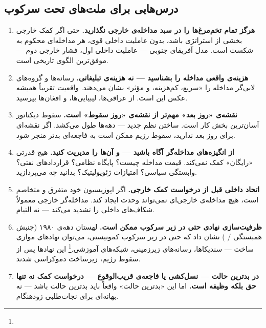 \subsection{درس‌هایی برای ملت‌های تحت سرکوب}
\label{subsec:ch15-lessons-oppressed}

\begin{tcolorbox}[successbox, title={هفت درس عملی برای ملت‌های تحت سرکوب}]
\begin{enumerate}
\item \textbf{هرگز تمام تخم‌مرغ‌ها را در سبد مداخله‌ی خارجی نگذارید.} حتی اگر کمک خارجی بخشی از استراتژی باشد، بدون عاملیت داخلی قوی، هر مداخله‌ای محکوم به شکست است. مدل آفریقای جنوبی — عاملیت داخلی اول، فشار خارجی دوم — موفق‌ترین الگوی تاریخی است.

\item \textbf{هزینه‌ی واقعی مداخله را بشناسید — نه هزینه‌ی تبلیغاتی.} رسانه‌ها و گروه‌های لابی‌گر مداخله را «سریع، کم‌هزینه، و مؤثر» نشان می‌دهند. واقعیت تقریباً همیشه عکس این است. از عراقی‌ها، لیبیایی‌ها، و افغان‌ها بپرسید.

\item \textbf{نقشه‌ی «روز بعد» مهم‌تر از نقشه‌ی «روز سقوط» است.} سقوط دیکتاتور آسان‌ترین بخش کار است. ساختن نظم جدید — دهه‌ها طول می‌کشد. اگر نقشه‌ای برای روز بعد ندارید، سقوط رژیم ممکن است به فاجعه‌ای بدتر منجر شود.

\item \textbf{از انگیزه‌های مداخله‌گر آگاه باشید — و آن‌ها را مدیریت کنید.} هیچ قدرتی «رایگان» کمک نمی‌کند. قیمت مداخله چیست؟ پایگاه نظامی؟ قراردادهای نفتی؟ وابستگی سیاسی؟ امتیازات ژئوپولیتیک؟ بدانید چه می‌پردازید.

\item \textbf{اتحاد داخلی قبل از درخواست کمک خارجی.} اگر اپوزیسیون خود متفرق و متخاصم است، هیچ مداخله‌ی خارجی‌ای نمی‌تواند وحدت ایجاد کند. مداخله‌گر خارجی معمولاً شکاف‌های داخلی را تشدید می‌کند — نه التیام.

\item \textbf{ظرفیت‌سازی نهادی حتی در زیر سرکوب ممکن است.} لهستان دهه‌ی ۱۹۸۰ (جنبش همبستگی / ) نشان داد که حتی در زیر سرکوب کمونیستی، می‌توان نهادهای موازی ساخت — سندیکاها، رسانه‌های زیرزمینی، شبکه‌های آموزشی.\footnote{} این نهادها پس از سقوط رژیم، زیرساخت دموکراسی شدند.

\item \textbf{در بدترین حالت — نسل‌کشی یا فاجعه‌ی قریب‌الوقوع — درخواست کمک نه تنها حق بلکه وظیفه است.} اما این «بدترین حالت» واقعاً باید بدترین حالت باشد — نه بهانه‌ای برای نجات‌طلبی زودهنگام.
\end{enumerate}
\end{tcolorbox}

